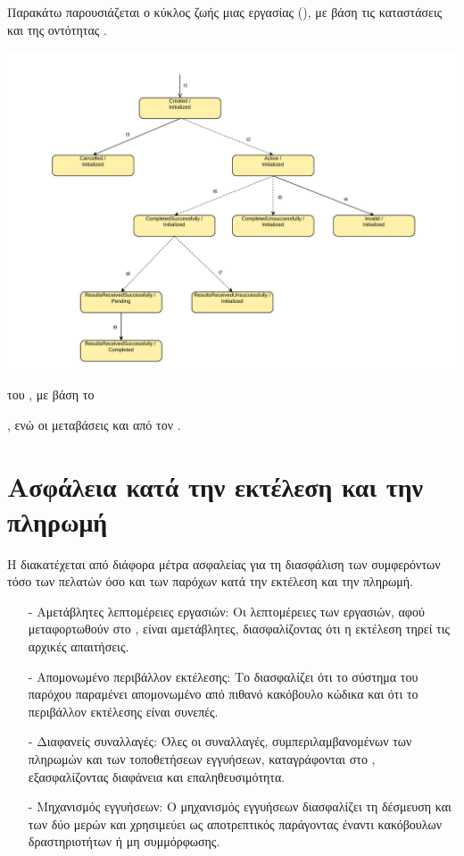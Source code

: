 Παρακάτω παρουσιάζεται ο κύκλος ζωής μιας εργασίας (), με βάση τις καταστάσεις  και  της οντότητας .
\begin{illustration}
    \centering
    \includegraphics[width=1.2\textwidth]{figures/figure-007.pdf}
    \caption{ του , με βάση το }
    \begin{minipage}{\textwidth}
        \small
        , ενώ οι μεταβάσεις  και   από τον .
      \end{minipage}
\end{illustration}


\newpage
\section{Ασφάλεια κατά την εκτέλεση και την πληρωμή}
Η  διακατέχεται από διάφορα μέτρα ασφαλείας για τη διασφάλιση των συμφερόντων τόσο των πελατών όσο και των παρόχων κατά την εκτέλεση και την πληρωμή.
\begin{itemize}
    \item[-] Αμετάβλητες λεπτομέρειες εργασιών: Οι λεπτομέρειες των εργασιών, αφού μεταφορτωθούν στο , είναι αμετάβλητες, διασφαλίζοντας ότι η εκτέλεση τηρεί τις αρχικές απαιτήσεις.
    \item[-] Απομονωμένο περιβάλλον εκτέλεσης: Το  διασφαλίζει ότι το σύστημα του παρόχου παραμένει απομονωμένο από πιθανό κακόβουλο κώδικα και ότι το περιβάλλον εκτέλεσης είναι συνεπές. 
    \item[-] Διαφανείς συναλλαγές: Όλες οι συναλλαγές, συμπεριλαμβανομένων των πληρωμών και των τοποθετήσεων εγγυήσεων, καταγράφονται στο , εξασφαλίζοντας διαφάνεια και επαληθευσιμότητα.
    \item[-] Μηχανισμός εγγυήσεων:  Ο μηχανισμός εγγυήσεων διασφαλίζει τη δέσμευση και των δύο μερών και χρησιμεύει ως αποτρεπτικός παράγοντας έναντι κακόβουλων δραστηριοτήτων ή μη συμμόρφωσης.
\end{itemize}


